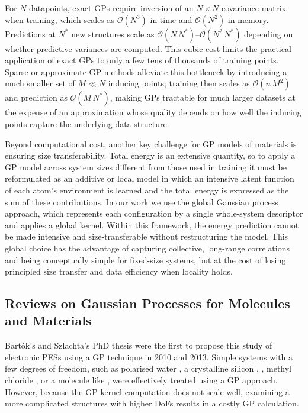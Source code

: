 For \(N\) datapoints, exact GPs require inversion of an \(N\times N\) covariance matrix when training, which scales as \(\mathcal{O}(N^3)\) in time and \(\mathcal{O}(N^2)\) in memory. 
Predictions at \(N^\ast\) new structures scale as \(\mathcal{O}(N\,N^\ast)\)–\(\mathcal{O}(N^2\,N^\ast)\) depending on whether predictive variances are computed. 
This cubic cost limits the practical application of exact GPs to only a few tens of thousands of training points. 
Sparse or approximate GP methods alleviate this bottleneck by introducing a much smaller set of \(M\ll N\) inducing points; training then scales as \(\mathcal{O}(n\,M^2)\) and prediction as \(\mathcal{O}(M\,N^\ast)\), making GPs tractable for much larger datasets at the expense of an approximation whose quality depends on how well the inducing points capture the underlying data structure.

Beyond computational cost, another key challenge for GP models of materials is ensuring size transferability. 
Total energy is an extensive quantity, so to apply a GP model across system sizes different from those used in training it must be reformulated as an additive or local model in which an intensive latent function of each atom’s environment is learned and the total energy is expressed as the sum of these contributions.
In our work we use the global Gaussian process approach, which represents each configuration by a single whole-system descriptor and applies a global kernel. Within this framework, the energy prediction cannot be made intensive and size-transferable without restructuring the model. This global choice has the advantage of capturing collective, long-range correlations and being conceptually simple for fixed-size systems, but at the cost of losing principled size transfer and data efficiency when locality holds.

\subsection{Reviews on Gaussian Processes for Molecules and Materials}
Bart\'{o}k's and Szlachta's PhD thesis \cite{thesis1, thesis2} were the first to propose this study of electronic PESs using a GP technique in 2010 and 2013. 
Simple systems with a few degrees of freedom, such as polarised water \cite{Handley2009}, a crystalline silicon \cite{Bartk2018, Strickson2019},  \cite{Cui2016}, methyl chloride \cite{Dral2017}, or a molecule like  \cite{Dai2020}, were effectively treated using a GP approach.
However, because the GP kernel computation does not scale well, examining a more complicated structures with higher DoFs results in a costly GP calculation.

